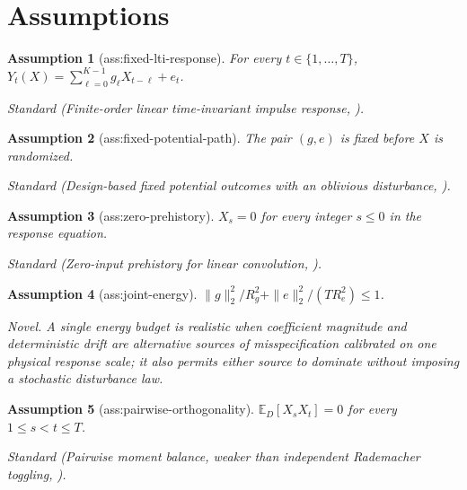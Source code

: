 \documentclass{article}
\newtheorem{assumption}{Assumption}
\begin{document}
\section{Assumptions}

\begin{assumption}[ass:fixed-lti-response]\label{ass:fixed-lti-response}
For every \(t\in\{1,\ldots,T\}\), \(Y_t(X)=\sum_{\ell=0}^{K-1}g_{\ell}X_{t-\ell}+e_t\).
\par\smallskip\noindent\emph{Standard} (Finite-order linear time-invariant impulse response, \cite{LiangRecht2025}).
\end{assumption}

\begin{assumption}[ass:fixed-potential-path]\label{ass:fixed-potential-path}
The pair \((g,e)\) is fixed before \(X\) is randomized.
\par\smallskip\noindent\emph{Standard} (Design-based fixed potential outcomes with an oblivious disturbance, \cite{LiangRecht2025}).
\end{assumption}

\begin{assumption}[ass:zero-prehistory]\label{ass:zero-prehistory}
\(X_s=0\) for every integer \(s\le 0\) in the response equation.
\par\smallskip\noindent\emph{Standard} (Zero-input prehistory for linear convolution, \cite{LiangRecht2025}).
\end{assumption}

\begin{assumption}[ass:joint-energy]\label{ass:joint-energy}
\(\|g\|_2^2/R_g^2+\|e\|_2^2/(T R_e^2)\le 1\).
\par\smallskip\noindent\emph{Novel.} A single energy budget is realistic when coefficient magnitude and deterministic drift are alternative sources of misspecification calibrated on one physical response scale; it also permits either source to dominate without imposing a stochastic disturbance law.
\end{assumption}

\begin{assumption}[ass:pairwise-orthogonality]\label{ass:pairwise-orthogonality}
\(\mathbb E_D[X_sX_t]=0\) for every \(1\le s<t\le T\).
\par\smallskip\noindent\emph{Standard} (Pairwise moment balance, weaker than independent Rademacher toggling, \cite{LiangRecht2025}).
\end{assumption}
\end{document}
